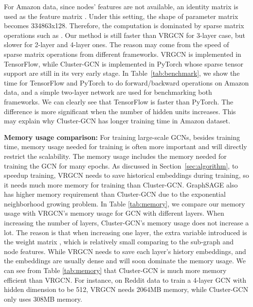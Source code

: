 \documentclass[sigconf]{acmart}
\begin{document}
For Amazon data, since nodes' features are not available, an identity matrix is used as the feature matrix .
Under this setting, the shape of parameter matrix  becomes 334863x128.
Therefore, the computation is dominated by sparse matrix operations such as . Our method is still faster than VRGCN for 3-layer case, but slower for 2-layer and 4-layer ones. The reason may come from the speed of sparse matrix operations from different frameworks.
VRGCN is implemented in TensorFlow, while Cluster-GCN is implemented in PyTorch whose sparse tensor support are still in its very early stage.
In Table~\ref{tab:benchmark}, we show the time for TensorFlow and PyTorch to do forward/backward operations on Amazon data, and a simple two-layer network are used for benchmarking both frameworks.
We can clearly see that TensorFlow is faster than PyTorch. The difference is more significant when the number of hidden units increases.
This may explain why Cluster-GCN has longer training time in Amazon dataset.


{\bf Memory usage comparison:} For training large-scale GCNs, besides training time, memory usage needed for training is often more important and will directly restrict the scalability. The memory usage includes the memory needed for training the GCN for many epochs. 
As discussed in Section~\ref{sec:algorithm}, to speedup training, VRGCN needs to save historical embeddings during training, so it needs much more memory for training than Cluster-GCN. GraphSAGE also has higher memory requirement than Cluster-GCN due to the exponential neighborhood growing problem. In Table \ref{tab:memory}, we compare our memory usage with VRGCN's memory usage for GCN with different layers. When increasing the number of layers, Cluster-GCN's memory usage does not increase a lot. The reason is that when increasing one layer, the extra variable introduced is the weight matrix , which is relatively small comparing to the sub-graph and node features. While VRGCN needs to save each layer's history embeddings, and the embeddings are usually dense and will soon dominate the memory usage. We can see from Table \ref{tab:memory} that Cluster-GCN is much more memory efficient than VRGCN. For instance, on Reddit data to train a 4-layer GCN with hidden dimension to be 512, VRGCN needs 2064MB memory, while Cluster-GCN only uses 308MB memory.
\end{document}
